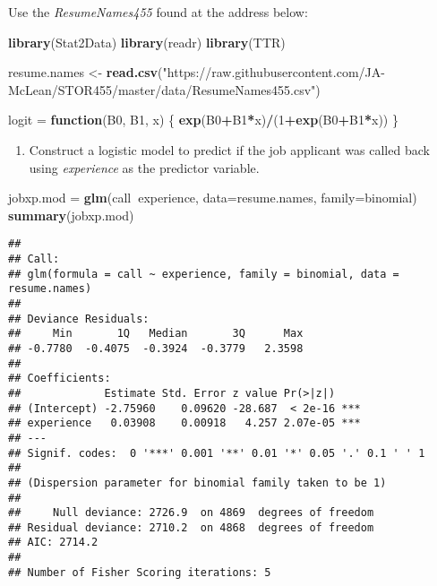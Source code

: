\documentclass[
]{article}
\newenvironment{Shaded}{\begin{snugshade}}{\end{snugshade}}
\newcommand{\ControlFlowTok}[1]{\textcolor[rgb]{0.13,0.29,0.53}{\textbf{#1}}}
\newcommand{\DataTypeTok}[1]{\textcolor[rgb]{0.13,0.29,0.53}{#1}}
\newcommand{\DecValTok}[1]{\textcolor[rgb]{0.00,0.00,0.81}{#1}}
\newcommand{\KeywordTok}[1]{\textcolor[rgb]{0.13,0.29,0.53}{\textbf{#1}}}
\newcommand{\NormalTok}[1]{#1}
\newcommand{\OperatorTok}[1]{\textcolor[rgb]{0.81,0.36,0.00}{\textbf{#1}}}
\newcommand{\StringTok}[1]{\textcolor[rgb]{0.31,0.60,0.02}{#1}}
\providecommand{\tightlist}{%
  \setlength{\itemsep}{0pt}\setlength{\parskip}{0pt}}
\begin{document}
Use the \emph{ResumeNames455} found at the address below:

\begin{Shaded}
\begin{Highlighting}[]
\KeywordTok{library}\NormalTok{(Stat2Data)}
\KeywordTok{library}\NormalTok{(readr)}
\KeywordTok{library}\NormalTok{(TTR)}

\NormalTok{resume.names <-}\StringTok{ }\KeywordTok{read.csv}\NormalTok{(}\StringTok{"https://raw.githubusercontent.com/JA-McLean/STOR455/master/data/ResumeNames455.csv"}\NormalTok{)}
\end{Highlighting}
\end{Shaded}

\begin{Shaded}
\begin{Highlighting}[]
\NormalTok{logit =}\StringTok{ }\ControlFlowTok{function}\NormalTok{(B0, B1, x)}
\NormalTok{  \{}
    \KeywordTok{exp}\NormalTok{(B0}\OperatorTok{+}\NormalTok{B1}\OperatorTok{*}\NormalTok{x)}\OperatorTok{/}\NormalTok{(}\DecValTok{1}\OperatorTok{+}\KeywordTok{exp}\NormalTok{(B0}\OperatorTok{+}\NormalTok{B1}\OperatorTok{*}\NormalTok{x))}
\NormalTok{  \}}
\end{Highlighting}
\end{Shaded}

\begin{enumerate}
\def\labelenumi{\arabic{enumi})}
\tightlist
\item
  Construct a logistic model to predict if the job applicant was called
  back using \emph{experience} as the predictor variable.
\end{enumerate}

\begin{Shaded}
\begin{Highlighting}[]
\NormalTok{jobxp.mod =}\StringTok{ }\KeywordTok{glm}\NormalTok{(call}\OperatorTok{~}\NormalTok{experience, }\DataTypeTok{data=}\NormalTok{resume.names, }\DataTypeTok{family=}\NormalTok{binomial)}
\KeywordTok{summary}\NormalTok{(jobxp.mod)}
\end{Highlighting}
\end{Shaded}

\begin{verbatim}
## 
## Call:
## glm(formula = call ~ experience, family = binomial, data = resume.names)
## 
## Deviance Residuals: 
##     Min       1Q   Median       3Q      Max  
## -0.7780  -0.4075  -0.3924  -0.3779   2.3598  
## 
## Coefficients:
##             Estimate Std. Error z value Pr(>|z|)    
## (Intercept) -2.75960    0.09620 -28.687  < 2e-16 ***
## experience   0.03908    0.00918   4.257 2.07e-05 ***
## ---
## Signif. codes:  0 '***' 0.001 '**' 0.01 '*' 0.05 '.' 0.1 ' ' 1
## 
## (Dispersion parameter for binomial family taken to be 1)
## 
##     Null deviance: 2726.9  on 4869  degrees of freedom
## Residual deviance: 2710.2  on 4868  degrees of freedom
## AIC: 2714.2
## 
## Number of Fisher Scoring iterations: 5
\end{verbatim}
\end{document}
